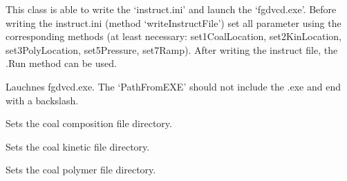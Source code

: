 \documentclass[letterpaper,10pt,english]{sphinxmanual}
\begin{document}
\begin{fulllineitems}
\label{FGDVCClasses:FGDVC_Fit_lin_regr.SetterAndLauncher}
This class is able to write the `instruct.ini' and launch the `fgdvcd.exe'. Before writing the instruct.ini (method `writeInstructFile') set all parameter using the corresponding methods (at least necessary: set1CoalLocation, set2KinLocation, set3PolyLocation, set5Pressure, set7Ramp). After writing the instruct file, the .Run method can be used.

\begin{fulllineitems}
\label{FGDVCClasses:FGDVC_Fit_lin_regr.SetterAndLauncher.Run}
Lauchnes fgdvcd.exe. The `PathFromEXE' should not include the .exe and end with a backslash.

\end{fulllineitems}


\begin{fulllineitems}
\label{FGDVCClasses:FGDVC_Fit_lin_regr.SetterAndLauncher.set1CoalLocation}
Sets the coal composition file directory.

\end{fulllineitems}


\begin{fulllineitems}
\label{FGDVCClasses:FGDVC_Fit_lin_regr.SetterAndLauncher.set2KinLocation}
Sets the coal kinetic file directory.

\end{fulllineitems}


\begin{fulllineitems}
\label{FGDVCClasses:FGDVC_Fit_lin_regr.SetterAndLauncher.set3PolyLocation}
Sets the coal polymer file directory.

\end{fulllineitems}


\end{fulllineitems}
\end{document}
